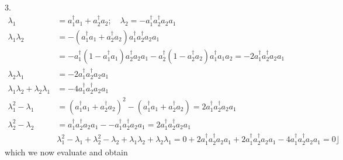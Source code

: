 \documentclass[aps,preprint]{revtex4}%
\begin{document}
3.%
\begin{align}
\lambda_{1}  &  =a_{1}^{\dagger}a_{1}+a_{2}^{\dagger}a_{2};\quad\lambda
_{2}=-a_{1}^{\dagger}a_{2}^{\dagger}a_{2}a_{1}\nonumber\\
\lambda_{1}\lambda_{2}  &  =-\left(  a_{1}^{\dagger}a_{1}+a_{2}^{\dagger}%
a_{2}\right)  a_{1}^{\dagger}a_{2}^{\dagger}a_{2}a_{1}\nonumber\\
&  =-a_{1}^{\dagger}\left(  1-a_{1}^{\dagger}a_{1}\right)  a_{2}^{\dagger
}a_{2}a_{1}-a_{2}^{\dagger}\left(  1-a_{2}^{\dagger}a_{2}\right)
a_{1}^{\dagger}a_{1}a_{2}=-2a_{1}^{\dagger}a_{2}^{\dagger}a_{2}a_{1}%
\nonumber\\
\lambda_{2}\lambda_{1}  &  =-2a_{1}^{\dagger}a_{2}^{\dagger}a_{2}%
a_{1}\nonumber\\
\lambda_{1}\lambda_{2}+\lambda_{2}\lambda_{1}  &  =-4a_{1}^{\dagger}%
a_{2}^{\dagger}a_{2}a_{1}\nonumber\\
\lambda_{1}^{2}-\lambda_{1}  &  =\left(  a_{1}^{\dagger}a_{1}+a_{2}^{\dagger
}a_{2}\right)  ^{2}-\left(  a_{1}^{\dagger}a_{1}+a_{2}^{\dagger}a_{2}\right)
=2a_{1}^{\dagger}a_{2}^{\dagger}a_{2}a_{1}\nonumber\\
\lambda_{2}^{2}-\lambda_{2}  &  =a_{1}^{\dagger}a_{2}^{\dagger}a_{2}%
a_{1}--a_{1}^{\dagger}a_{2}^{\dagger}a_{2}a_{1}=2a_{1}^{\dagger}a_{2}%
^{\dagger}a_{2}a_{1}\nonumber\\
&  \lambda_{1}^{2}-\lambda_{1}+\lambda_{2}^{2}-\lambda_{2}+\lambda_{1}%
\lambda_{2}+\lambda_{2}\lambda_{1}=0+2a_{1}^{\dagger}a_{2}^{\dagger}a_{2}%
a_{1}+2a_{1}^{\dagger}a_{2}^{\dagger}a_{2}a_{1}-4a_{1}^{\dagger}a_{2}%
^{\dagger}a_{2}a_{1}=0\rfloor
\end{align}
which we now evaluate and obtain%
\end{document}
